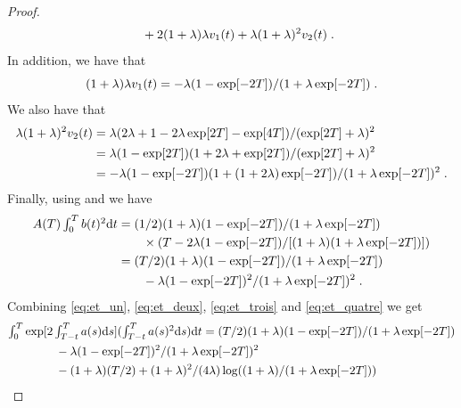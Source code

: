\begin{proof}
\begin{align}
      & \qquad + 2(1+\lambda)\lambda v_1(t) + \lambda(1+\lambda)^2 v_2(t) \; . \label{eq:et_un}
    \end{align}
    In addition, we have that
    \begin{equation}
      (1+\lambda)\lambda v_1(t) = -\lambda(1 - \exp[-2T])/(1 + \lambda \exp[-2T]) \; . \label{eq:et_deux}
    \end{equation}
    We also have that
    \begin{align}
      \lambda(1+\lambda)^2 v_2(t) &= \lambda (2 \lambda + 1 - 2 \lambda \exp[2T] - \exp[4T])/(\exp[2T] + \lambda)^2 \\
                                  &= \lambda (1 - \exp[2T])(1 + 2\lambda  + \exp[2T]) /(\exp[2T] + \lambda)^2 \\
                                    &= -\lambda (1 - \exp[-2T])(1 + (1 + 2\lambda) \exp[-2T]) /(1 + \lambda \exp[-2T])^2 \; . \label{eq:et_trois}
    \end{align}
    Finally, using  and  we have
    \begin{align}
      \textstyle{A(T) \int_0^T b(t)^2 \mathrm{d}t} &= \textstyle{(1/2)(1+\lambda)  (1 -  \exp[-2T])/(1 + \lambda \exp[-2T])}\\
                                              & \qquad \times (T - 2 \lambda(1 - \exp[-2T]) / [(1 + \lambda)(1 + \lambda \exp[-2T])])   \\
                                              & = (T/2)(1+\lambda)  (1 -  \exp[-2T])/(1 + \lambda \exp[-2T]) \\
      & \qquad - \lambda (1 -  \exp[-2T])^2/(1 + \lambda \exp[-2T])^2 \; .  \label{eq:et_quatre}
    \end{align}
    Combining \eqref{eq:et_un}, \eqref{eq:et_deux},
    \eqref{eq:et_trois} and \eqref{eq:et_quatre} we get
  \begin{align}
    &\textstyle{\int_0^T \exp[2\int_{T-t}^T a(s) \rmd s] (\int_{T-t}^T a(s)^2 \rmd s) \rmd t} = (T/2)(1+\lambda)(1-\exp[-2T])/(1+\lambda \exp[-2T]) \\
                                                                                             & \qquad \qquad - \lambda(1- \exp[-2T])^2/(1 + \lambda \exp[-2T])^2 \\
                                                                                             & \qquad \qquad - (1 + \lambda)(T/2) + (1+\lambda)^2/(4\lambda)\log((1+\lambda)/(1 + \lambda \exp[-2T])) \\

\end{align}
\end{proof}
